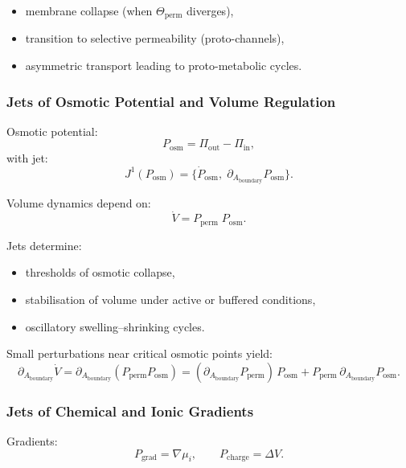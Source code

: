 \begin{itemize}
    \item membrane collapse (when $\Theta_{\mathrm{perm}}$ diverges),
    \item transition to selective permeability (proto-channels),
    \item asymmetric transport leading to proto-metabolic cycles.
\end{itemize}


\subsubsection{Jets of Osmotic Potential and Volume Regulation}

Osmotic potential:
\[
P_{\mathrm{osm}} = \Pi_{\mathrm{out}} - \Pi_{\mathrm{in}},
\]
with jet:
\[
J^1(P_{\mathrm{osm}})=
\{\dot{P}_{\mathrm{osm}},\; \partial_{A_{\mathrm{boundary}}}P_{\mathrm{osm}}\}.
\]

Volume dynamics depend on:
\[
\dot{V}
=
P_{\mathrm{perm}}\; P_{\mathrm{osm}}.
\]

Jets determine:

\begin{itemize}
    \item thresholds of osmotic collapse,
    \item stabilisation of volume under active or buffered conditions,
    \item oscillatory swelling–shrinking cycles.
\end{itemize}

Small perturbations near critical osmotic points yield:
\[
\partial_{A_{\mathrm{boundary}}}\dot{V}
=
\partial_{A_{\mathrm{boundary}}}(P_{\mathrm{perm}}P_{\mathrm{osm}})
=
(\partial_{A_{\mathrm{boundary}}}P_{\mathrm{perm}})\,P_{\mathrm{osm}}
+
P_{\mathrm{perm}}\,
\partial_{A_{\mathrm{boundary}}}P_{\mathrm{osm}}.
\]


\subsubsection{Jets of Chemical and Ionic Gradients}

Gradients:
\[
P_{\mathrm{grad}} = \nabla\mu_i,
\qquad
P_{\mathrm{charge}} = \Delta V.
\]

